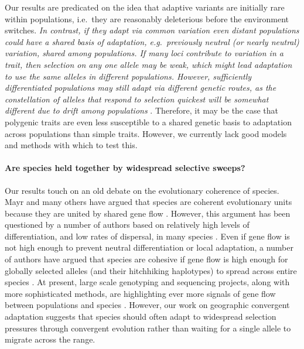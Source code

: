 \documentclass{article}
\newcommand{\mfp}[1]{{\it\color{red}#1}}
\begin{document}
Our results are predicated on the idea that adaptive variants are
initially rare within populations, i.e.\ they are reasonably
deleterious before the environment switches. \mfp{ In contrast, if they adapt via common variation even distant populations could have
a shared basis of adaptation, e.g.\ previously neutral (or nearly neutral) variation, shared among populations. 
If many loci contribute to variation in a trait, then
selection on any one allele may be weak, 
which might lead adaptation to use the same alleles in different populations.
However, sufficiently differentiated populations may still
adapt via different genetic routes, as the constellation of alleles
that respond to selection quickest will be somewhat different due to
drift among populations} \citep{Barton:89}.
Therefore, it may be the case that polygenic traits are even less susceptible to a shared
genetic basis to adaptation across populations than simple traits.   
However, we currently lack good models and methods with which to test this.


\paragraph{Are species held together by widespread selective sweeps?}
Our results touch on an old debate on the evolutionary coherence of species. 
Mayr and many others have argued that species are coherent
evolutionary units because they are united by shared gene flow \citep[pages 521--522 in][]{Mayr:SpeciesEvol}. 
However, this argument has been questioned by a number of authors 
based on relatively high levels of differentiation, and low rates of dispersal, in many species \citep{EhrlichRaven:69,Levin:79}.
Even if gene flow is not high enough to prevent neutral differentiation or local adaptation, 
a number of authors have argued that species are cohesive 
if gene flow is high enough for globally selected alleles 
(and their hitchhiking haplotypes)
to spread across entire species 
\citep[see also][]{Rieseberg2001,MorjanRieseberg:04,Ellstrand2014}.
At present, large scale genotyping and sequencing projects, 
along with more sophisticated methods, 
are highlighting ever more signals of gene flow between populations and species \citep{Patterson:12,SousaHey:13,Hellenthal:14}.
However, our work on geographic convergent adaptation
\citep[see also][]{ralphcoop2010,RalphCoop:14} 
suggests that species should often adapt to
widespread selection pressures through convergent evolution rather
than waiting for a single allele to migrate across the range. 
\end{document}
